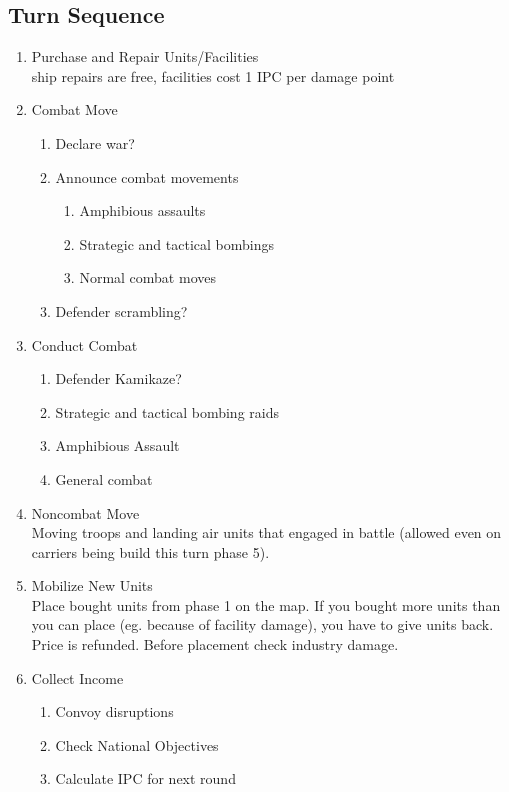 \documentclass[10pt,a4paper,landscape]{article}
\begin{document}
\begin{multicols*}{3}

\section*{Turn Sequence}
\begin{enumerate}
\item Purchase and Repair Units/Facilities\\
ship repairs are free, facilities cost 1 IPC per damage point 
\item Combat Move
\begin{enumerate}
\item Declare war?
\item Announce combat movements
\begin{enumerate}
\item Amphibious assaults
\item Strategic and tactical bombings
\item Normal combat moves
\end{enumerate}
\item Defender scrambling?
\end{enumerate}
\item Conduct Combat
\begin{enumerate}
\item Defender Kamikaze?
\item Strategic and tactical bombing raids
\item Amphibious Assault
\item General combat
\end{enumerate}
\item Noncombat Move\\
Moving troops and landing air units that engaged in battle (allowed even on carriers being build this turn phase 5).
\item Mobilize New Units\\
Place bought units from phase 1 on the map. If you bought more units than you can place (eg. because of facility damage), you have to give units back. Price is refunded. Before placement check industry damage.
\item Collect Income
\begin{enumerate}
\item Convoy disruptions
\item Check National Objectives
\item Calculate IPC for next round
\end{enumerate}
\end{enumerate}
\columnbreak


\end{multicols*}
\end{document}
